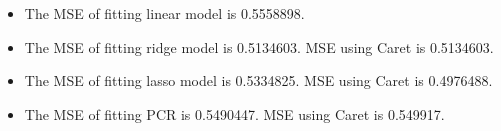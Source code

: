 \documentclass[]{article}
\begin{document}
\begin{itemize}
\item
  The MSE of fitting linear model is 0.5558898.
\item
  The MSE of fitting ridge model is 0.5134603. MSE using Caret is
  0.5134603.
\item
  The MSE of fitting lasso model is 0.5334825. MSE using Caret is
  0.4976488.
\item
  The MSE of fitting PCR is 0.5490447. MSE using Caret is 0.549917.
\end{itemize}
\end{document}
